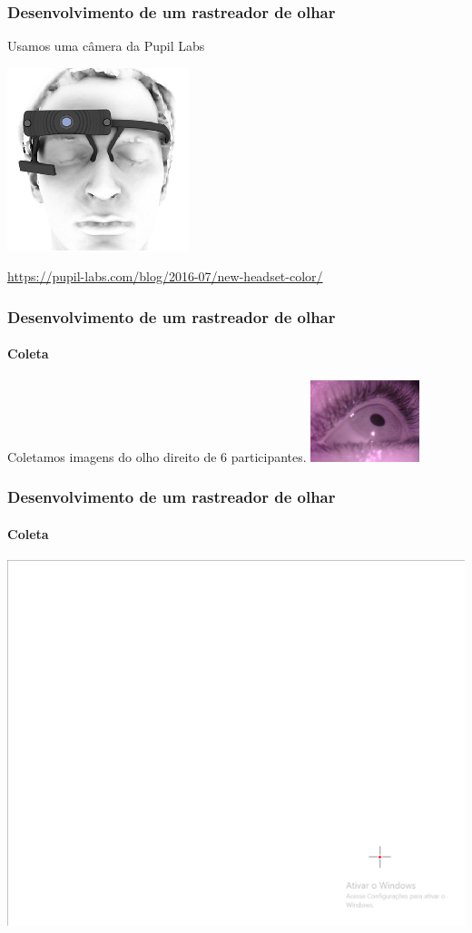 \documentclass[11pt]{beamer}
\begin{document}
\begin{frame}
\frametitle{Desenvolvimento de um rastreador de olhar}

Usamos uma câmera da Pupil Labs

\vspace{1cm}
\centering
\includegraphics[scale=.6]{imagens/pupil.png}

\tiny{\url{https://pupil-labs.com/blog/2016-07/new-headset-color/}}
\end{frame}

\begin{frame}
\frametitle{Desenvolvimento de um rastreador de olhar}
\framesubtitle{Coleta}

Coletamos imagens do olho direito de $6$ participantes.
\centering
\includegraphics[scale=1]{imagens/26.jpg}
\end{frame}

\begin{frame}
\frametitle{Desenvolvimento de um rastreador de olhar}
\framesubtitle{Coleta}

\centering
\includegraphics[scale=.6]{imagens/alvo.png}
\end{frame}
\end{document}
